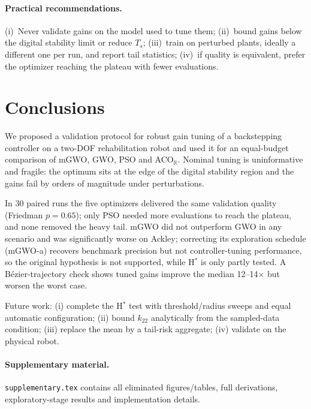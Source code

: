 \documentclass[10pt,journal,compsoc]{IEEEtran}
\newcommand{\mgwo}{mGWO}
\newcommand{\mgwoa}{mGWO-a}
\newcommand{\acor}{ACO$_\mathbb{R}$}
\begin{document}
\paragraph{Practical recommendations.} (i)~Never validate gains on the model used to tune them; (ii)~bound gains below the digital stability limit or reduce $T_s$; (iii)~train on perturbed plants, ideally a different one per run, and report tail statistics; (iv)~if quality is equivalent, prefer the optimizer reaching the plateau with fewer evaluations.

\section{Conclusions}\label{sec:concl}
We proposed a validation protocol for robust gain tuning of a backstepping controller on a two-DOF rehabilitation robot and used it for an equal-budget comparison of \mgwo{}, GWO, PSO and \acor{}. Nominal tuning is uninformative and fragile: the optimum sits at the edge of the digital stability region and the gains fail by orders of magnitude under perturbations.

In 30 paired runs the five optimizers delivered the same validation quality (Friedman $p=0.65$); only PSO needed more evaluations to reach the plateau, and none removed the heavy tail. \mgwo{} did not outperform GWO in any scenario and was significantly worse on Ackley; correcting its exploration schedule (\mgwoa{}) recovers benchmark precision but not controller-tuning performance, so the original hypothesis is not supported, while H$^\ast$ is only partly tested. A B\'ezier-trajectory check shows tuned gains improve the median 12--14$\times$ but worsen the worst case.

Future work: (i) complete the H$^\ast$ test with threshold/radius sweeps and equal automatic configuration; (ii) bound $k_{22}$ analytically from the sampled-data condition; (iii) replace the mean by a tail-risk aggregate; (iv) validate on the physical robot.

\paragraph{Supplementary material.} \texttt{supplementary.tex} contains all eliminated figures/tables, full derivations, exploratory-stage results and implementation details.
\end{document}
